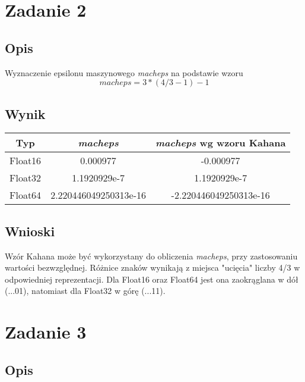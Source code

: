 \documentclass[12pt, letterpaper]{article}
\begin{document}
\clearpage

\section{Zadanie 2}

\subsection{Opis}

Wyznaczenie epsilonu maszynowego \textit{macheps} na podstawie wzoru
\[ macheps = 3*(4/3 - 1) - 1 \]

\subsection{Wynik}

\begin{center}
    \begin{tabular}{|c | c | c|}
        \hline
        Typ     & \textit{macheps}      & \textit{macheps} wg wzoru Kahana \\
        \hline
        Float16 & 0.000977              & -0.000977                        \\
        \hline
        Float32 & 1.1920929e-7          & 1.1920929e-7                     \\
        \hline
        Float64 & 2.220446049250313e-16 & -2.220446049250313e-16           \\
        \hline
    \end{tabular}
\end{center}

\subsection{Wnioski}

Wzór Kahana może być wykorzystany do obliczenia \textit{macheps}, przy
zastosowaniu wartości bezwzględnej.
Różnice znaków wynikają z miejsca "ucięcia" liczby 4/3 w odpowiedniej
reprezentacji.
Dla Float16 oraz Float64 jest ona zaokrąglana w dół (...01), natomiast dla
Float32 w górę (...11).

\section{Zadanie 3}

\subsection{Opis}
\end{document}
